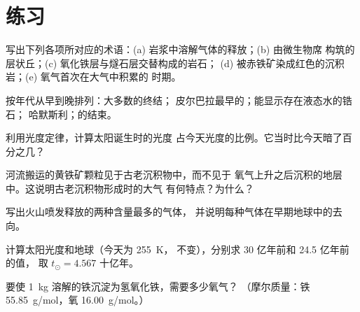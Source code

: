 \section{练习}

\begin{exercise}[$\star$]\label{exo:g12:early-earth:1}
写出下列各项所对应的术语：(a) 岩浆中溶解气体的释放；(b) 由微生物席
构筑的层状丘；(c) 氧化铁层与燧石层交替构成的岩石；
(d) 被赤铁矿染成红色的沉积岩；(e) 氧气首次在大气中积累的
时期。
\end{exercise}

\begin{exercise}[$\star$]\label{exo:g12:early-earth:2}
按年代从早到晚排列：大多数的终结；
皮尔巴拉最早的；能显示存在液态水的锆石；
哈默斯利；的结束。
\end{exercise}

\begin{exercise}[$\star$]\label{exo:g12:early-earth:3}
 利用光度定律，计算太阳诞生时的光度
 占今天光度的比例。它当时比今天暗了百分之几？
\end{exercise}

\begin{exercise}[$\star$]\label{exo:g12:early-earth:4}
 河流搬运的黄铁矿颗粒见于古老沉积物中，而不见于
 氧气上升之后沉积的地层中。这说明古老沉积物形成时的大气
 有何特点？为什么？
\end{exercise}

\begin{exercise}[$\star$]\label{exo:g12:early-earth:5}
 写出火山喷发释放的两种含量最多的气体，
 并说明每种气体在早期地球中的去向。
\end{exercise}

\begin{exercise}[$\star\star$]\label{exo:g12:early-earth:6}
 计算太阳光度和地球（今天为 \qty{255}{K}，
 不变），分别求 30 亿年前和 24.5 亿年前的值，
 取 $t_\odot = 4.567$ 十亿年。
\end{exercise}

\begin{exercise}[$\star\star$]\label{exo:g12:early-earth:7}
 要使 \qty{1}{kg} 溶解的铁沉淀为氢氧化铁，需要多少氧气？
 （摩尔质量：铁 \qty{55.85}{g/mol}，氧
 \qty{16.00}{g/mol}。）
\end{exercise}

